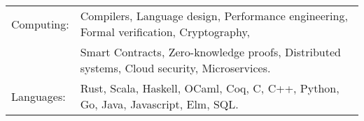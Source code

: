 \begin{tabular}{l l}
  Computing: & Compilers, Language design, Performance engineering, Formal verification, Cryptography, \\
         & Smart Contracts, Zero-knowledge proofs, Distributed systems, Cloud security, Microservices. \\
  Languages: & Rust, Scala, Haskell, OCaml, Coq, C, C++, Python, Go, Java, Javascript, Elm, SQL. \\
\end{tabular}


